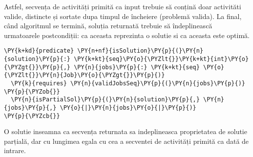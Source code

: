 Astfel, secvența de activități primită  ca input trebuie să conțină doar activităti valide, distincte și sortate dupa timpul de încheiere (problemă valida). 
La final, când algoritmul se termină, soluția returnată trebuie să îndeplinească urmatoarele postcondiții: ca aceasta reprezinta o solutie si ca aceasta este optimă. 
\begin{Verbatim}[commandchars=\\\{\}, fontsize=\small]
\PY{k+kd}{predicate} \PY{n+nf}{isSolution}\PY{p}{(}\PY{n}{solution}\PY{p}{:} \PY{k+kt}{seq}\PY{o}{\PYZlt{}}\PY{k+kt}{int}\PY{o}{\PYZgt{}}\PY{p}{,} \PY{n}{jobs}\PY{p}{:} \PY{k+kt}{seq} \PY{o}{\PYZlt{}}\PY{n}{Job}\PY{o}{\PYZgt{}}\PY{p}{)}
  \PY{k}{requires} \PY{n}{validJobsSeq}\PY{p}{(}\PY{n}{jobs}\PY{p}{)}
\PY{p}{\PYZob{}}
  \PY{n}{isPartialSol}\PY{p}{(}\PY{n}{solution}\PY{p}{,} \PY{n}{jobs}\PY{p}{,} \PY{o}{|}\PY{n}{jobs}\PY{o}{|}\PY{p}{)}
\PY{p}{\PYZcb{}}
\end{Verbatim}
O solutie inseamna ca secvența returnata sa indeplineasca proprietatea de solutie parțială, dar cu lungimea egala cu cea a secventei de activități primită ca dată de intrare.

